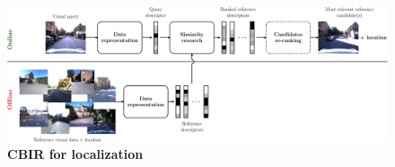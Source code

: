 \begin{figure}[t]
	\centering

	\includegraphics[width=\linewidth]{methods/cbir_for_localization}
	\caption[CBIR for localization]{\textbf{CBIR for localization} \label{fig:cbir_for_localization}}
\end{figure}
